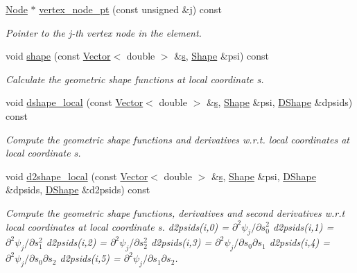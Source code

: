 \begin{DoxyCompactItemize}
\hyperlink{classoomph_1_1Node}{Node} $\ast$ \hyperlink{classoomph_1_1TElement_3_013_00_01NNODE__1D_01_4_a790d5689d21337506b780e2f6bd26296}{vertex\+\_\+node\+\_\+pt} (const unsigned \&j) const
\begin{DoxyCompactList}\small\item\em Pointer to the j-\/th vertex node in the element. \end{DoxyCompactList}\item 
void \hyperlink{classoomph_1_1TElement_3_013_00_01NNODE__1D_01_4_a9b6f628400ab805a7131fd4b195b8beb}{shape} (const \hyperlink{classoomph_1_1Vector}{Vector}$<$ double $>$ \&\hyperlink{cfortran_8h_ab7123126e4885ef647dd9c6e3807a21c}{s}, \hyperlink{classoomph_1_1Shape}{Shape} \&psi) const
\begin{DoxyCompactList}\small\item\em Calculate the geometric shape functions at local coordinate s. \end{DoxyCompactList}\item 
void \hyperlink{classoomph_1_1TElement_3_013_00_01NNODE__1D_01_4_ae78236047f635d9d739b91efb36f9922}{dshape\+\_\+local} (const \hyperlink{classoomph_1_1Vector}{Vector}$<$ double $>$ \&\hyperlink{cfortran_8h_ab7123126e4885ef647dd9c6e3807a21c}{s}, \hyperlink{classoomph_1_1Shape}{Shape} \&psi, \hyperlink{classoomph_1_1DShape}{D\+Shape} \&dpsids) const
\begin{DoxyCompactList}\small\item\em Compute the geometric shape functions and derivatives w.\+r.\+t. local coordinates at local coordinate s. \end{DoxyCompactList}\item 
void \hyperlink{classoomph_1_1TElement_3_013_00_01NNODE__1D_01_4_a504635eec7569c7c7d07888f35e04bf5}{d2shape\+\_\+local} (const \hyperlink{classoomph_1_1Vector}{Vector}$<$ double $>$ \&\hyperlink{cfortran_8h_ab7123126e4885ef647dd9c6e3807a21c}{s}, \hyperlink{classoomph_1_1Shape}{Shape} \&psi, \hyperlink{classoomph_1_1DShape}{D\+Shape} \&dpsids, \hyperlink{classoomph_1_1DShape}{D\+Shape} \&d2psids) const
\begin{DoxyCompactList}\small\item\em Compute the geometric shape functions, derivatives and second derivatives w.\+r.\+t local coordinates at local coordinate s. d2psids(i,0) = $ \partial^2 \psi_j / \partial s_0^2 $ d2psids(i,1) = $ \partial^2 \psi_j / \partial s_1^2 $ d2psids(i,2) = $ \partial^2 \psi_j / \partial s_2^2 $ d2psids(i,3) = $ \partial^2 \psi_j / \partial s_0 \partial s_1 $ d2psids(i,4) = $ \partial^2 \psi_j / \partial s_0 \partial s_2 $ d2psids(i,5) = $ \partial^2 \psi_j / \partial s_1 \partial s_2 $. \end{DoxyCompactList}\item 

\end{DoxyCompactItemize}
